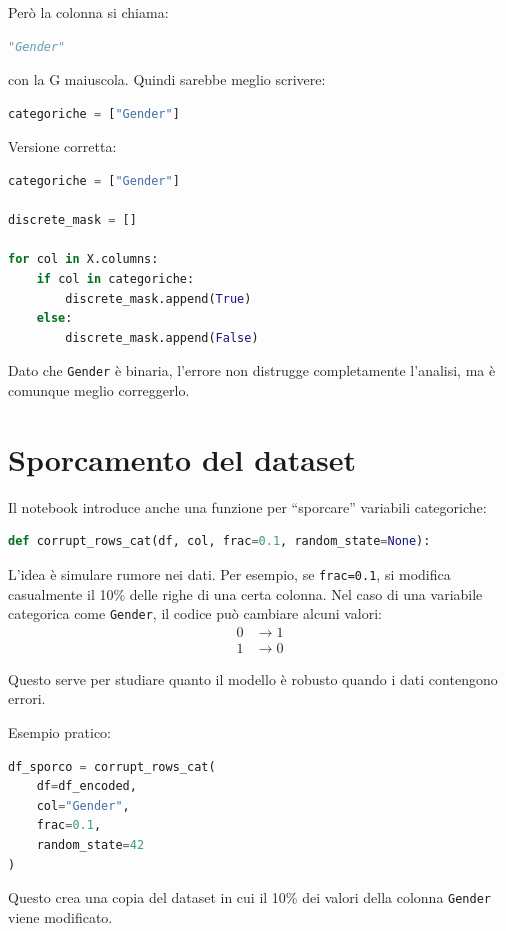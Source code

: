 \documentclass[11pt,a4paper]{article}
\begin{document}
Però la colonna si chiama:
\begin{lstlisting}[language=Python]
"Gender"
\end{lstlisting}

con la G maiuscola. Quindi sarebbe meglio scrivere:
\begin{lstlisting}[language=Python]
categoriche = ["Gender"]
\end{lstlisting}

Versione corretta:
\begin{lstlisting}[language=Python]
categoriche = ["Gender"]

discrete_mask = []

for col in X.columns:
    if col in categoriche:
        discrete_mask.append(True)
    else:
        discrete_mask.append(False)
\end{lstlisting}

Dato che \texttt{Gender} è binaria, l'errore non distrugge completamente l'analisi, ma è comunque meglio correggerlo.

\section{Sporcamento del dataset}
Il notebook introduce anche una funzione per ``sporcare'' variabili categoriche:
\begin{lstlisting}[language=Python]
def corrupt_rows_cat(df, col, frac=0.1, random_state=None):
\end{lstlisting}

L'idea è simulare rumore nei dati. Per esempio, se \texttt{frac=0.1}, si modifica casualmente il 10\% delle righe di una certa colonna. Nel caso di una variabile categorica come \texttt{Gender}, il codice può cambiare alcuni valori:
\begin{align*}
    0 &\rightarrow 1 \\
    1 &\rightarrow 0
\end{align*}

Questo serve per studiare quanto il modello è robusto quando i dati contengono errori.

Esempio pratico:
\begin{lstlisting}[language=Python]
df_sporco = corrupt_rows_cat(
    df=df_encoded,
    col="Gender",
    frac=0.1,
    random_state=42
)
\end{lstlisting}

Questo crea una copia del dataset in cui il 10\% dei valori della colonna \texttt{Gender} viene modificato.
\end{document}
